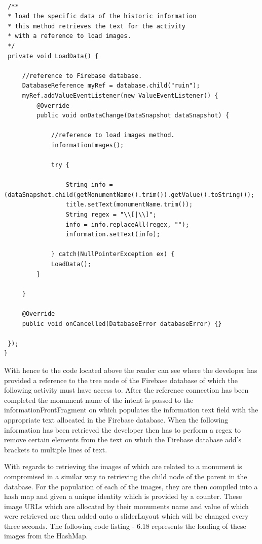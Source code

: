 \begin{lstlisting}[style=myCustomMatlabStyle, basicstyle=\small, breaklines, caption=Loading Information of Monuments,captionpos=b]

 /**
 * load the specific data of the historic information
 * this method retrieves the text for the activity
 * with a reference to load images.
 */
 private void LoadData() {
     
     //reference to Firebase database.
     DatabaseReference myRef = database.child("ruin");
     myRef.addValueEventListener(new ValueEventListener() {
         @Override
         public void onDataChange(DataSnapshot dataSnapshot) {
             
             //reference to load images method.
             informationImages();
             
             try {
                 
                 String info = (dataSnapshot.child(getMonumentName().trim()).getValue().toString());
                 title.setText(monumentName.trim());
                 String regex = "\\[|\\]";
                 info = info.replaceAll(regex, "");
                 information.setText(info);
                 
             } catch(NullPointerException ex) {
             LoadData();
         }
         
     }
     
     @Override
     public void onCancelled(DatabaseError databaseError) {}
     
 });
}
\end{lstlisting}
\par
With hence to the code located above the reader can see where the developer has provided a reference to the tree node of the Firebase database of which the following activity must have access to.  After the reference connection has been completed the monument name of the intent is passed to the informationFrontFragment on which populates the information text field with the appropriate text allocated in the Firebase database. When the following information has been retrieved the developer then has to perform a regex to remove certain elements from the text on which the Firebase database add's brackets to multiple lines of text.
\par
With regards to retrieving the images of which are related to a monument is compromised in a similar way to retrieving the child node of the parent in the database. For the population of each of the images, they are then compiled into a hash map and given a unique identity which is provided by a counter. These image URLs which are allocated by their monuments name and value of which were retrieved are then added onto a sliderLayout which will be changed every three seconds. The following code listing - 6.18 represents the loading of these images from the HashMap.

